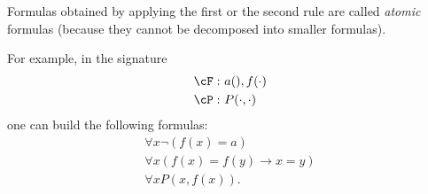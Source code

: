 

\setcounter{section}{1}
\setcounter{subsection}{1}
\setcounter{dfn}{3}

Formulas obtained by applying the first or the second rule are called \emph{atomic} formulas (because they cannot be decomposed into smaller formulas).

For example, in the signature
\begin{align*}
\cF:\ &a(), f(\cdot) \\
\cP:\ &P(\cdot, \cdot)
\end{align*}
one can build the following formulas:
\begin{gather*}
\forall x \neg(f(x) = a)\\
\forall x (f(x)=f(y) \to x=y)\\
\forall x P(x, f(x)).
\end{gather*}



